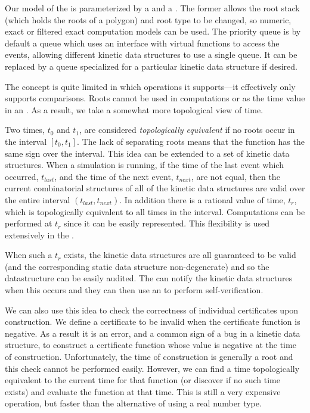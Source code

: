 Our model of the  is parameterized by a
 and a . The former allows the
root stack (which holds the roots of a polygon) and root
type to be changed, so numeric, exact or filtered exact computation
models can be used. The priority queue is by default a queue which
uses an interface with virtual functions to access the events,
allowing different kinetic data structures to use a single queue. It
can be replaced by a queue specialized for a particular kinetic data
structure if desired.

The  concept is quite limited in which operations it supports---it
effectively only supports comparisons.  Roots cannot be used
in computations or as the time value in an . As a result, we take
a somewhat more topological view of time. 

Two times, $t_0$ and $t_1$, are considered \textit{topologically
equivalent} if no roots occur in the interval $[t_0,t_1]$. The lack of
separating roots means that the function has the same sign over the
interval. This idea can be extended to a set of kinetic data
structures. When a simulation is running, if the time of the last event
which occurred, $t_{last}$, and the time of the next event,
$t_{next}$, are not equal, then the current combinatorial structures of
all of the kinetic data structures are valid over the entire interval
$(t_{last},t_{next})$. In addition there is a rational value of time,
$t_r$, which is topologically equivalent to all times in the
interval. Computations can be performed at $t_r$ since it can be
easily represented. This flexibility is used extensively in the .

When such a $t_r$ exists, the kinetic data structures are all
guaranteed to be valid (and the corresponding static data structure
non-degenerate) and so the datastructure can be easily audited. The  can
notify the kinetic data structures when this occurs and they can then
use an  to perform self-verification.

We can also use this idea to check the correctness of individual
certificates upon construction. We define a certificate to be invalid
when the certificate function is negative. As a result it
is an error, and a common sign of a bug in a kinetic data structure,
to construct a certificate function whose value is negative at the
time of construction. 
%
Unfortunately, the time of construction is
generally a root and this check cannot be performed easily. However,
we can find a time topologically equivalent to the current time for
that function (or discover if no such time exists) and evaluate the
function at that time. This is still a very expensive operation, but
faster than the alternative of using a real number type.

